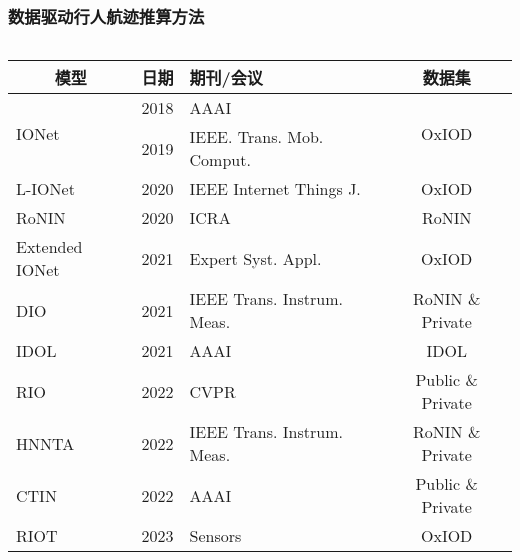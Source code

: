 \begin{frame}
	\frametitle{数据驱动行人航迹推算方法}
	\vspace{-0.5cm}
	\begin{columns}[t]
		\begin{column}{0.4\textwidth}
		{
		    \tiny
		    \setlength{\tabcolsep}{2pt}
			\begin{tabular*}{1.2\textwidth}{@{\extracolsep{\fill}}lclc}
				\toprule
				\multicolumn{1}{c}{模型} & 日期 & 期刊/会议 & 数据集 \\
				\midrule
				\multirow{2}{*}{IONet} & 2018 & AAAI                            & \multirow{2}{*}{OxIOD} \\ %
				                       & 2019 & IEEE. Trans. Mob. Comput.       &                        \\ %
				               L-IONet & 2020 & IEEE Internet Things J.         & OxIOD                  \\ %
				                 RoNIN & 2020 & ICRA                            & RoNIN                  \\ %
				        Extended IONet & 2021 & Expert Syst. Appl.              & OxIOD                   \\ 
				                   DIO & 2021 & IEEE Trans. Instrum. Meas.      & RoNIN \& Private       \\ %
				                  IDOL & 2021 & AAAI                            & IDOL                   \\ %
				                   RIO & 2022 & CVPR                            & Public \& Private      \\ %
				                 HNNTA & 2022 & IEEE Trans. Instrum. Meas.      & RoNIN \& Private       \\ %
				                  CTIN & 2022 & AAAI                            & Public \& Private      \\ %
				                  RIOT & 2023 & Sensors                         & OxIOD                  \\

\end{tabular*}}
\end{column}
\end{columns}
\end{frame}
